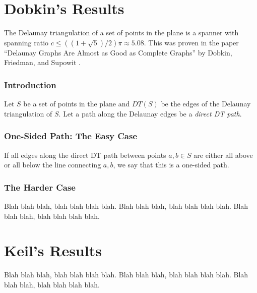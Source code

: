 \documentclass{tufte-handout}
\title{\DocTitle}
\author{\DocAuthor}
\begin{document}
\maketitle


\part{Dobkin's Results}

The Delaunay triangulation of a set of points in the plane is a
spanner with spanning ratio $c \le ((1 + \sqrt{5})/2)\pi \approx
5.08$.  This was proven in the paper ``Delaunay Graphs Are Almost as
Good as Complete Graphs'' by Dobkin, Friedman, and Supowit
\cite{Dobkin:1987} \cite{Dobkin:1990}.

\section{Introduction}

Let $S$ be a set of points in the plane and $DT(S)$ be the edges of
the Delaunay triangulation of $S$.  Let a path along the Delaunay
edges be a \emph{direct DT path}.

\section{One-Sided Path: The Easy Case}

If all edges along the direct DT path between points $a,b \in S$ are
either all above or all below the line connecting $a,b$, we say that
this is a one-sided path.



\section{The Harder Case}

Blah blah blah, blah blah blah blah.  Blah blah blah, blah blah blah
blah.  Blah blah blah, blah blah blah blah.

\part{Keil's Results}

Blah blah blah, blah blah blah blah.  Blah blah blah, blah blah blah
blah.  Blah blah blah, blah blah blah blah.


\newpage

\end{document}
